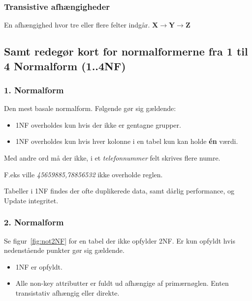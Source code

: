 \subsubsection{Transistive afhængigheder}
En afhængighed hvor tre eller flere felter indgår.
\textbf{X$\rightarrow$Y$\rightarrow$Z}


\subsection{Samt redegør kort for normalformerne fra 1 til 4 Normalform (1..4NF)}

\subsubsection{1. Normalform}
Den mest basale normalform. Følgende gør sig gældende:

\begin{itemize}
	\item 1NF overholdes kun hvis der ikke er gentagne grupper.
	\item 1NF overholdes kun hvis hver kolonne i en tabel kun kan holde \textbf{én} værdi. 
\end{itemize}

Med andre ord må der ikke, i et \textit{telefonnummer} felt skrives flere numre. 

F.eks ville \textit{45659885,78856532} ikke overholde reglen.


Tabeller i 1NF findes der ofte duplikerede data, samt dårlig performance, og Update integritet.
	
\subsubsection{2. Normalform}
Se figur~\ref{fig:not2NF} for en tabel der ikke opfylder 2NF. Er kun opfyldt hvis nedenstående punkter gør sig gældende. 
	
\begin{itemize}
	\item 1NF er opfyldt.
	\item Alle non-key attributter er fuldt ud afhængige af primærnøglen. Enten transistativ afhængig eller direkte.
\end{itemize}

